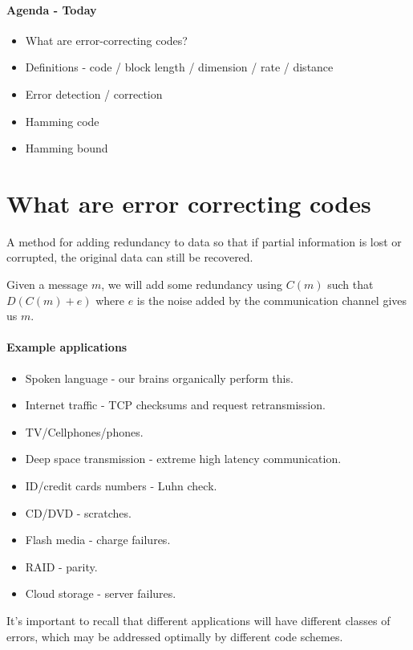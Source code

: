 \documentclass{idc_msc}
\begin{document}
\paragraph{Agenda - Today}

\begin{itemize}
  \item What are error-correcting codes?
  \item Definitions - code / block length / dimension / rate / distance
  \item Error detection / correction
  \item Hamming code
  \item Hamming bound
\end{itemize}

\section{What are error correcting codes}

A method for adding redundancy to data so that if partial information is lost or corrupted, the original data can still be recovered.

Given a message $m$, we will add some redundancy using $C(m)$ such that $D(C(m) + e)$ where $e$ is the noise added by the communication channel gives us $m$.

\paragraph{Example applications}

\begin{itemize}
  \item Spoken language - our brains organically perform this.
  \item Internet traffic - TCP checksums and request retransmission.
  \item TV/Cellphones/phones.
  \item Deep space transmission - extreme high latency communication.
  \item ID/credit cards numbers - Luhn check.
  \item CD/DVD - scratches.
  \item Flash media - charge failures.
  \item RAID - parity.
  \item Cloud storage - server failures.
\end{itemize}

It's important to recall that different applications will have different classes of errors, which may be addressed optimally by different code schemes.
\end{document}
